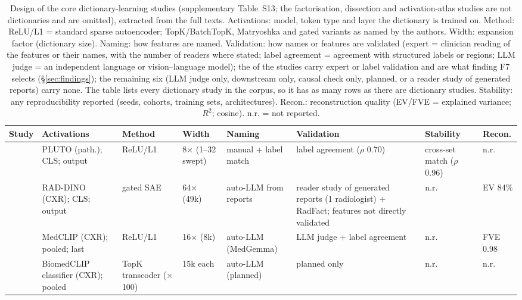 \begin{table}
\centering\scriptsize\setlength\tabcolsep{3.5pt}\renewcommand{\arraystretch}{0.92}
\caption{Design of the core dictionary-learning studies (supplementary Table~S13; the factorisation, dissection and activation-atlas studies are not dictionaries and are omitted), extracted from the full texts. Activations: model, token type and layer the dictionary is trained on. Method: ReLU/L1 = standard sparse autoencoder; TopK/BatchTopK, Matryoshka and gated variants as named by the authors. Width: expansion factor (dictionary size). Naming: how features are named. Validation: how names or features are validated (expert = clinician reading of the features or their names, with the number of readers where stated; label agreement = agreement with structured labels or regions; LLM judge = an independent language or vision--language model); the \Nsaeval{} of the \Nsae{} studies carry expert or label validation and are what finding F7 selects (\S\ref{sec:findings}); the remaining six (LLM judge only, downstream only, causal check only, planned, or a reader study of generated reports) carry none. The table lists every dictionary study in the corpus, so it has as many rows as there are dictionary studies. Stability: any reproducibility reported (seeds, cohorts, training sets, architectures). Recon.: reconstruction quality (EV/FVE = explained variance; $R^2$; cosine). n.r. = not reported.}
\label{tab:saedesign}
\begin{tabular}{@{}L{2.80cm}L{3.85cm}L{2.51cm}L{1.73cm}L{2.26cm}L{2.93cm}L{1.73cm}L{1.46cm}@{}}
\toprule
Study & Activations & Method & Width & Naming & Validation & Stability & Recon. \\
\midrule
\cite{le2024learning} & PLUTO (path.); CLS; output & ReLU/L1 & 8$\times$ (1--32 swept) & manual + label match & label agreement ($\rho$ 0.70) & cross-set match ($\rho$ 0.96) & n.r. \\
\cite{abdulaal2024an} & RAD-DINO (CXR); CLS; output & gated SAE & 64$\times$ (49k) & auto-LLM from reports & reader study of generated reports (1 radiologist) + RadFact; features not directly validated & n.r. & EV 84\% \\
\cite{renzulli2025medsae} & MedCLIP (CXR); pooled; last & ReLU/L1 & 16$\times$ (8k) & auto-LLM (MedGemma) & LLM judge + label agreement & n.r. & FVE 0.98 \\
\cite{tang2025cxrlanic} & BiomedCLIP classifier (CXR); pooled & TopK transcoder ($\times$100) & 15k each & auto-LLM (planned) & planned only & n.r. & n.r. \\

\end{tabular}
\end{table}
